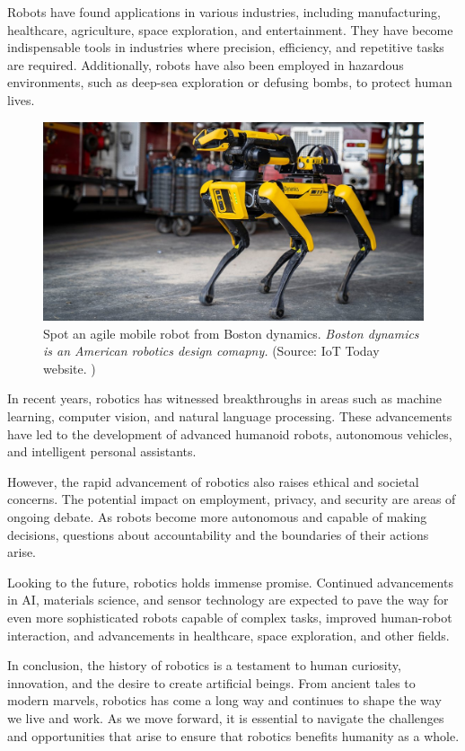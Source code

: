Robots have found applications in various industries, including manufacturing, healthcare, agriculture, space exploration, and entertainment. They have become indispensable tools in industries where precision, efficiency, and repetitive tasks are required. Additionally, robots have also been employed in hazardous environments, such as deep-sea exploration or defusing bombs, to protect human lives.
\begin{figure}[H]
    \centering
    \includegraphics[scale=.45]{images/boston-dynamics-spot}
    \caption[Boston dynamics robot (spot)]{Spot an agile mobile robot from Boston dynamics. \textit{Boston dynamics is an American robotics design comapny.} (Source: IoT Today website. \cite{iotworldtoday})}
\end{figure}

In recent years, robotics has witnessed breakthroughs in areas such as machine learning, computer vision, and natural language processing. These advancements have led to the development of advanced humanoid robots, autonomous vehicles, and intelligent personal assistants.


However, the rapid advancement of robotics also raises ethical and societal concerns. The potential impact on employment, privacy, and security are areas of ongoing debate. As robots become more autonomous and capable of making decisions, questions about accountability and the boundaries of their actions arise.

Looking to the future, robotics holds immense promise. Continued advancements in AI, materials science, and sensor technology are expected to pave the way for even more sophisticated robots capable of complex tasks, improved human-robot interaction, and advancements in healthcare, space exploration, and other fields.

In conclusion, the history of robotics is a testament to human curiosity, innovation, and the desire to create artificial beings. From ancient tales to modern marvels, robotics has come a long way and continues to shape the way we live and work. As we move forward, it is essential to navigate the challenges and opportunities that arise to ensure that robotics benefits humanity as a whole.

